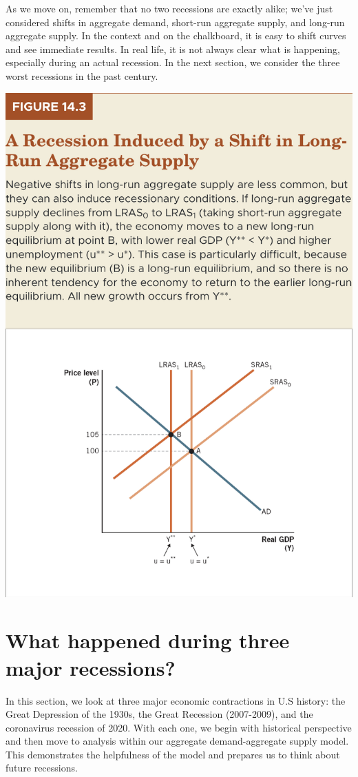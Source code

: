 \documentclass[11pt]{article} %
\begin{document}
As we move on, remember that no two recessions are exactly alike; we've just considered shifts in aggregate demand, short-run aggregate supply, and long-run aggregate supply. In the context and on the chalkboard, it is easy to shift curves and see immediate results. In real life, it is not always clear what is happening, especially during an actual recession. In the next section, we consider the three worst recessions in the past century.

\begin{center}
\includegraphics[scale=0.5]{images/Figure 14.3.png}
\end{center}

\section*{What happened during three major recessions?}
In this section, we look at three major economic contractions in U.S history: the Great Depression of the 1930s, the Great Recession (2007-2009), and the coronavirus recession of 2020. With each one, we begin with historical perspective and then move to analysis within our aggregate demand-aggregate supply model. This demonstrates the helpfulness of the model and prepares us to think about future recessions.
\end{document}
